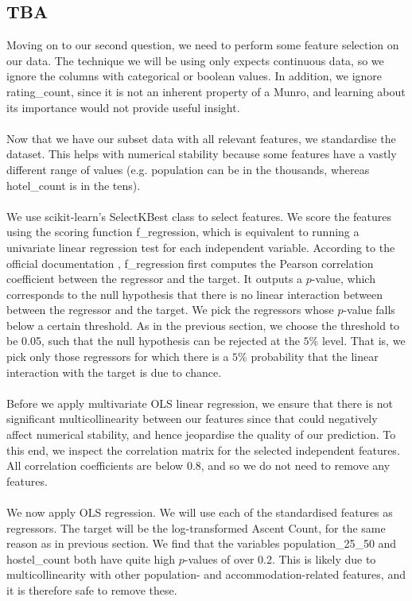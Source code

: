\documentclass[11pt,a4paper]{article}
\begin{document}
\subsection{TBA}
Moving on to our second question, we need to perform some feature selection on our data. The technique we will be using only expects continuous data, so we ignore the columns with categorical or boolean values. In addition, we ignore rating\_count, since it is not an inherent property of a Munro, and learning about its importance would not provide useful insight. \\ \\
Now that we have our subset data with all relevant features, we standardise the dataset. This helps with numerical stability because some features have a vastly different range of values (e.g. population can be in the thousands, whereas hotel\_count is in the tens). \\ \\
We use scikit-learn's SelectKBest class to select features. We score the features using the scoring function f\_regression, which is equivalent to running a univariate linear regression test for each independent variable. According to the official documentation \cite{scikit-learn}, f\_regression first computes the Pearson correlation coefficient between the regressor and the target. It outputs a $p$-value, which corresponds to the null hypothesis that there is no linear interaction between between the regressor and the target. We pick the regressors whose $p$-value falls below a certain threshold. As in the previous section, we choose the threshold to be 0.05, such that the null hypothesis can be rejected at the $5\%$ level. That is, we pick only those regressors for which there is a $5\%$ probability that the linear interaction with the target is due to chance. \\ \\
Before we apply multivariate OLS linear regression, we ensure that there is not significant multicollinearity between our features since that could negatively affect numerical stability, and hence jeopardise the quality of our prediction. To this end, we inspect the correlation matrix for the selected independent features. All correlation coefficients are below 0.8, and so we do not need to remove any features. \\ \\
We now apply OLS regression. We will use each of the standardised features as regressors. The target will be the log-transformed Ascent Count, for the same reason as in previous section. We find that the variables population\_25\_50 and hostel\_count both have quite high $p$-values of over 0.2. This is likely due to multicollinearity with other population- and accommodation-related features, and it is therefore safe to remove these. \\  \\
\end{document}
